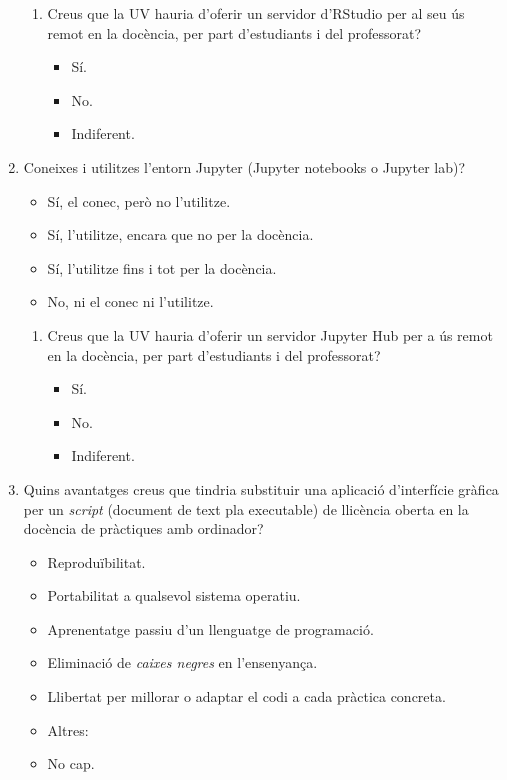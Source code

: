 \documentclass[a4paper,12pt]{article}
\begin{document}
\begin{enumerate}
\begin{enumerate}
   \item Creus que la UV hauria d'oferir un servidor d'RStudio per al seu ús remot en la
         docència, per part d'estudiants i del professorat?
      \begin{itemize}
      \item Sí.
      \item No.
      \item Indiferent.
      \end{itemize}
   \end{enumerate}

\item Coneixes i utilitzes l'entorn Jupyter (Jupyter notebooks o Jupyter lab)? \cite{Barba2019}
   \begin{itemize}
   \item Sí, el conec, però no l'utilitze.
   \item Sí, l'utilitze, encara que no per la docència.
   \item Sí, l'utilitze fins i tot per la docència.
   \item No, ni el conec ni l'utilitze.
   \end{itemize}

   \begin{enumerate}
   \item Creus que la UV hauria d'oferir un servidor Jupyter Hub per a ús remot en la docència,
         per part d'estudiants i del professorat? \cite{JupyterHub}
      \begin{itemize}
      \item Sí.
      \item No.
      \item Indiferent.
      \end{itemize}
   \end{enumerate}

\item Quins avantatges creus que tindria substituir una aplicació d'interfície gràfica per un
      \emph{script} (document de text pla executable) de llicència oberta en la docència de
      pràctiques amb ordinador?
   \begin{itemize}
   \item Reproduïbilitat.
   \item Portabilitat a qualsevol sistema operatiu.
   \item Aprenentatge passiu d'un llenguatge de programació.
   \item Eliminació de \emph{caixes negres} en l'ensenyança.
   \item Llibertat per millorar o adaptar el codi a cada pràctica concreta.
   \item Altres:
   \item No cap.
   \end{itemize}


\end{enumerate}
\end{document}
